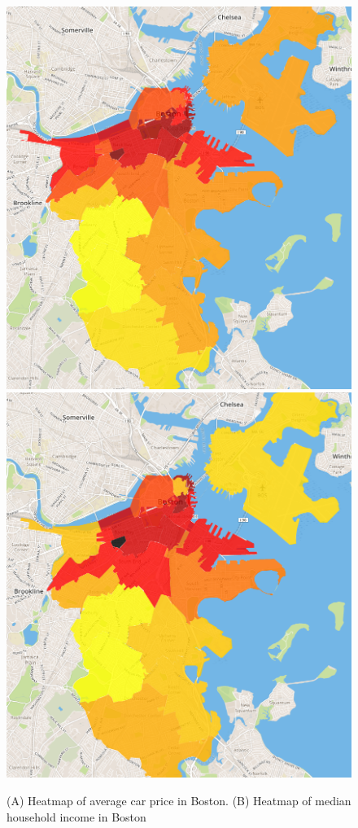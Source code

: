 \documentclass[10pt,twocolumn,letterpaper]{article}
\begin{document}
\begin{figure}[t]
\begin{center}
    \includegraphics[width=0.45\linewidth]{img/price.png}
    \includegraphics[width=0.45\linewidth]{img/income.png}
\end{center}
   \caption {(A) Heatmap of average car price in Boston. (B) Heatmap of median household income in Boston}
\label{fig:bosvis}
\end{figure}
\end{document}
